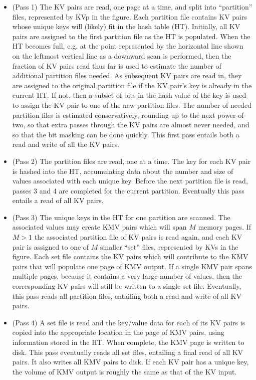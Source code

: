 \begin{itemize}

\item (Pass 1) The KV pairs are read, one page at a time, and split
into ``partition'' files, represented by KVp in the figure.  Each
partition file contains KV pairs whose unique keys will (likely) fit
in the hash table (HT).  Initially, all KV pairs are assigned to the
first partition file as the HT is populated.  When the HT becomes
full, e.g. at the point represented by the horizontal line shown on
the leftmost vertical line as a downward scan is performed, then the
fraction of KV pairs read thus far is used to estimate the number of
additional partition files needed.  As subsequent KV pairs are read
in, they are assigned to the original partition file if the KV pair's
key is already in the current HT.  If not, then a subset of bits in
the hash value of the key is used to assign the KV pair to one of the
new partition files.  The number of needed partition files is
estimated conservatively, rounding up to the next power-of-two, so
that extra passes through the KV pairs are almost never needed, and so
that the bit masking can be done quickly.  This first pass entails
both a read and write of all the KV pairs.

\item (Pass 2) The partition files are read, one at a time.  The key
for each KV pair is hashed into the HT, accumulating data about the
number and size of values associated with each unique key.  Before the
next partition file is read, passes 3 and 4 are completed for the
current partition.  Eventually this pass entails a read of all KV
pairs.

\item (Pass 3) The unique keys in the HT for one partition are
scanned.  The associated values may create KMV pairs which will span
$M$ memory pages.  If $M > 1$ the associated partition file of KV
pairs is read again, and each KV pair is assigned to one of $M$
smaller ``set'' files, represented by KVs in the figure.  Each set
file contains the KV pairs which will contribute to the KMV pairs that
will populate one page of KMV output.  If a single KMV pair spans
multiple pages, because it contains a very large number of values,
then the corresponding KV pairs will still be written to a single set
file.  Eventually, this pass reads all partition files, entailing both
a read and write of all KV pairs.

\item (Pass 4) A set file is read and the key/value data for each of
its KV pairs is copied into the appropriate location in the page of
KMV pairs, using information stored in the HT.  When complete, the KMV
page is written to disk.  This pass eventually reads all set files,
entailing a final read of all KV pairs.  It also writes all KMV pairs
to disk.  If each KV pair has a unique key, the volume of KMV output
is roughly the same as that of the KV input.

\end{itemize}


